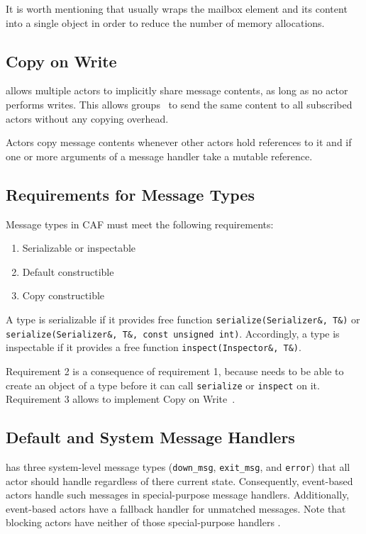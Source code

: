 It is worth mentioning that \lib usually wraps the mailbox element and its content into a single object in order to reduce the number of memory allocations.

\subsection{Copy on Write}
\label{copy-on-write}

\lib allows multiple actors to implicitly share message contents, as long as no actor performs writes. This allows groups~ to send the same content to all subscribed actors without any copying overhead.

Actors copy message contents whenever other actors hold references to it and if one or more arguments of a message handler take a mutable reference.

\subsection{Requirements for Message Types}

Message types in CAF must meet the following requirements:

\begin{enumerate}
\item Serializable or inspectable 
\item Default constructible
\item Copy constructible
\end{enumerate}

A type is serializable if it provides free function \lstinline^serialize(Serializer&, T&)^ or \lstinline^serialize(Serializer&, T&, const unsigned int)^. Accordingly, a type is inspectable if it provides a free function \lstinline^inspect(Inspector&, T&)^.

Requirement 2 is a consequence of requirement 1, because \lib needs to be able to create an object of a type before it can call \lstinline^serialize^ or \lstinline^inspect^ on it. Requirement 3 allows \lib to implement Copy on Write~.

\subsection{Default and System Message Handlers}
\label{special-handler}

\lib has three system-level message types (\lstinline^down_msg^, \lstinline^exit_msg^, and \lstinline^error^) that all actor should handle regardless of there current state. Consequently, event-based actors handle such messages in special-purpose message handlers. Additionally, event-based actors have a fallback handler for unmatched messages. Note that blocking actors have neither of those special-purpose handlers .

